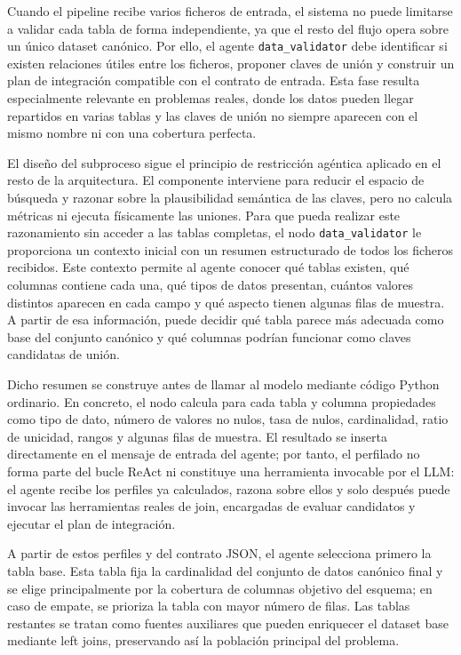 \documentclass[12pt,a4paper]{article}
\theoremstyle{plain}
\begin{document}
Cuando el pipeline recibe varios ficheros de entrada, el sistema no puede limitarse a validar cada tabla de forma independiente, ya que el resto del flujo opera sobre un único dataset canónico. Por ello, el agente \texttt{data\_validator} debe identificar si existen relaciones útiles entre los ficheros, proponer claves de unión y construir un plan de integración compatible con el contrato de entrada. Esta fase resulta especialmente relevante en problemas reales, donde los datos pueden llegar repartidos en varias tablas y las claves de unión no siempre aparecen con el mismo nombre ni con una cobertura perfecta.

El diseño del subproceso sigue el principio de restricción agéntica aplicado en el resto de la arquitectura. El componente interviene para reducir el espacio de búsqueda y razonar sobre la plausibilidad semántica de las claves, pero no calcula métricas ni ejecuta físicamente las uniones. Para que pueda realizar este razonamiento sin acceder a las tablas completas, el nodo \texttt{data\_validator} le proporciona un contexto inicial con un resumen estructurado de todos los ficheros recibidos. Este contexto permite al agente conocer qué tablas existen, qué columnas contiene cada una, qué tipos de datos presentan, cuántos valores distintos aparecen en cada campo y qué aspecto tienen algunas filas de muestra. A partir de esa información, puede decidir qué tabla parece más adecuada como base del conjunto canónico y qué columnas podrían funcionar como claves candidatas de unión.

Dicho resumen se construye antes de llamar al modelo mediante código Python ordinario. En concreto, el nodo calcula para cada tabla y columna propiedades como tipo de dato, número de valores no nulos, tasa de nulos, cardinalidad, ratio de unicidad, rangos y algunas filas de muestra. El resultado se inserta directamente en el mensaje de entrada del agente; por tanto, el perfilado no forma parte del bucle ReAct ni constituye una herramienta invocable por el LLM: el agente recibe los perfiles ya calculados, razona sobre ellos y solo después puede invocar las herramientas reales de join, encargadas de evaluar candidatos y ejecutar el plan de integración.



A partir de estos perfiles y del contrato JSON, el agente selecciona primero la tabla base. Esta tabla fija la cardinalidad del conjunto de datos canónico final y se elige principalmente por la cobertura de columnas objetivo del esquema; en caso de empate, se prioriza la tabla con mayor número de filas. Las tablas restantes se tratan como fuentes auxiliares que pueden enriquecer el dataset base mediante left joins, preservando así la población principal del problema. %
\end{document}

